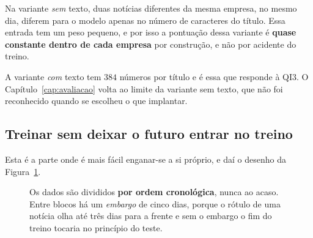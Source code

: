 \begin{tcolorbox}[colback=orange!5, colframe=orange!45, boxrule=0.5pt, arc=2pt]
Na variante \emph{sem} texto, duas notícias diferentes da mesma empresa, no mesmo dia, diferem
para o modelo apenas no número de caracteres do título. Essa entrada tem um peso pequeno, e por
isso a pontuação dessa variante é \textbf{quase constante dentro de cada empresa} por
construção, e não por acidente do treino.
\end{tcolorbox}

A variante \emph{com} texto tem $384$ números por título e é essa que responde à \gls{QI}3. O
Capítulo~\ref{cap:avaliacao} volta ao limite da variante sem texto, que não foi reconhecido quando
se escolheu o que implantar.

\subsection{Treinar sem deixar o futuro entrar no treino}
\label{sec:met_split}

Esta é a parte onde é mais fácil enganar-se a si próprio, e daí o desenho da
Figura~\ref{fig:divisao}.

\begin{figure}[ht]
\centering
{}
\caption[Divisão temporal com embargo]{Os dados são divididos \textbf{por ordem cronológica}, nunca
ao acaso. Entre blocos há um \emph{embargo} de cinco dias, porque o rótulo de uma notícia olha até
três dias para a frente e sem o embargo o fim do treino tocaria no princípio do teste.}
\label{fig:divisao}
\end{figure}

